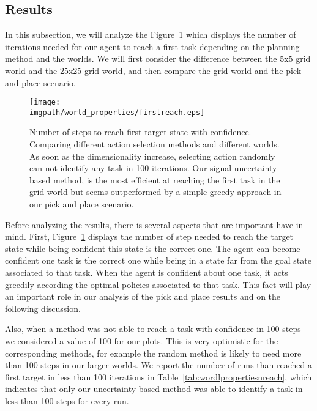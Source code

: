 \subsection{Results}

In this subsection, we will analyze the Figure~\ref{fig:wordlpropertiestimefirst} which displays the number of iterations needed for our agent to reach a first task depending on the planning method and the worlds. We will first consider the difference between the 5x5 grid world and the 25x25 grid world, and then compare the grid world and the pick and place scenario.

\begin{figure}[!ht]
\centering
\texttt{[image: \\imgpath/world\_properties/firstreach.eps]}
\caption{Number of steps to reach first target state with confidence. Comparing different action selection methods and different worlds. As soon as the dimensionality increase, selecting action randomly can not identify any task in 100 iterations. Our signal uncertainty based method, is the most efficient at reaching the first task in the grid world but seems outperformed by a simple greedy approach in our pick and place scenario.}
\label{fig:wordlpropertiestimefirst}
\end{figure}

Before analyzing the results, there is several aspects that are important have in mind. First, Figure~\ref{fig:wordlpropertiestimefirst} displays the number of step needed to reach the target state while being confident this state is the correct one. The agent can become confident one task is the correct one while being in a state far from the goal state associated to that task. When the agent is confident about one task, it acts greedily according the optimal policies associated to that task. This fact will play an important role in our analysis of the pick and place results and on the following discussion.

Also, when a method was not able to reach a task with confidence in 100 steps we considered a value of 100 for our plots. This is very optimistic for the corresponding methods, for example the random method is likely to need more than 100 steps in our larger worlds. We report the number of runs than reached a first target in less than 100 iterations in Table~\ref{tab:wordlpropertiesnreach}, which indicates that only our uncertainty based method was able to identify a task in less than 100 steps for every run. 

